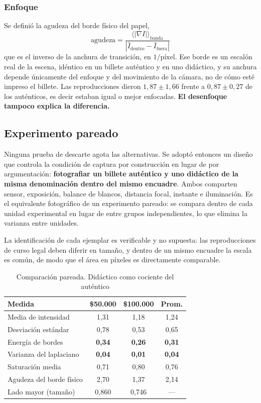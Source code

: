 \documentclass[conference]{IEEEtran}
\begin{document}
\subsubsection{Enfoque}
Se definió la agudeza del borde físico del papel,
\begin{equation}
\text{agudeza} = \frac{\langle|\nabla I|\rangle_{\text{banda}}}
{\left|\bar{I}_{\text{dentro}} - \bar{I}_{\text{fuera}}\right|}
\end{equation}
que es el inverso de la anchura de transición, en $1/\text{píxel}$. Ese
borde es un escalón real de la escena, idéntico en un billete auténtico
y en uno didáctico, y su anchura depende únicamente del enfoque y del
movimiento de la cámara, no de cómo esté impreso el billete. Las
reproducciones dieron $1{,}87 \pm 1{,}66$ frente a
$0{,}87 \pm 0{,}27$ de los auténticos, es decir estaban igual o mejor
enfocadas. \textbf{El desenfoque tampoco explica la diferencia.}

\subsection{Experimento pareado}

Ninguna prueba de descarte agota las alternativas. Se adoptó entonces un
diseño que controla la condición de captura por construcción en lugar de
por argumentación: \textbf{fotografiar un billete auténtico y uno
didáctico de la misma denominación dentro del mismo encuadre}. Ambos
comparten sensor, exposición, balance de blancos, distancia focal,
instante e iluminación. Es el equivalente fotográfico de un experimento
pareado: se compara dentro de cada unidad experimental en lugar de entre
grupos independientes, lo que elimina la varianza entre unidades.

La identificación de cada ejemplar es verificable y no supuesta: las
reproducciones de curso legal deben diferir en tamaño, y dentro de un
mismo encuadre la escala es común, de modo que el área en píxeles es
directamente comparable.

\begin{table}[h]
\centering
\caption{Comparación pareada. Didáctico como cociente del auténtico}
\label{tab:pareado}
\small
\begin{tabular}{@{}lccc@{}}
\toprule
\textbf{Medida} & \textbf{\$50.000} & \textbf{\$100.000} & \textbf{Prom.} \\
\midrule
Media de intensidad        & 1{,}31 & 1{,}18 & 1{,}24 \\
Desviación estándar        & 0{,}78 & 0{,}53 & 0{,}65 \\
Energía de bordes          & \textbf{0{,}34} & \textbf{0{,}26} & \textbf{0{,}31} \\
Varianza del laplaciano    & \textbf{0{,}04} & \textbf{0{,}01} & \textbf{0{,}04} \\
Saturación media           & 0{,}71 & 0{,}80 & 0{,}76 \\
Agudeza del borde físico   & 2{,}70 & 1{,}37 & 2{,}14 \\
\midrule
Lado mayor (tamaño)        & 0{,}860 & 0{,}746 & --- \\
\bottomrule
\end{tabular}
\end{table}
\end{document}

